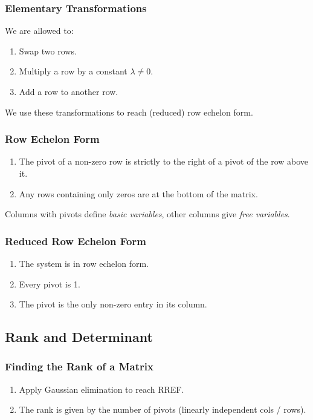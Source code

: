 \documentclass[10pt,twoside,twocolumn]{article}
\begin{document}
\subsubsection{Elementary Transformations}

We are allowed to: 
\begin{enumerate}
\item Swap two rows. 
\item Multiply a row by a constant $\lambda\neq0$. 
\item Add a row to another row. 
\end{enumerate}
We use these transformations to reach (reduced) row echelon form.


\subsubsection{Row Echelon Form}
\begin{enumerate}
\item The pivot of a non-zero row is strictly to the right of a pivot of
the row above it. 
\item Any rows containing only zeros are at the bottom of the matrix. 
\end{enumerate}
Columns with pivots define \emph{basic variables}, other columns give
\emph{free variables}.


\subsubsection{Reduced Row Echelon Form}
\begin{enumerate}
\item The system is in row echelon form. 
\item Every pivot is 1. 
\item The pivot is the only non-zero entry in its column. 
\end{enumerate}

\subsection{Rank and Determinant}


\subsubsection{Finding the Rank of a Matrix}
\begin{enumerate}
\item Apply Gaussian elimination to reach RREF. 
\item The rank is given by the number of pivots (linearly independent cols
/ rows). 
\end{enumerate}
\end{document}
